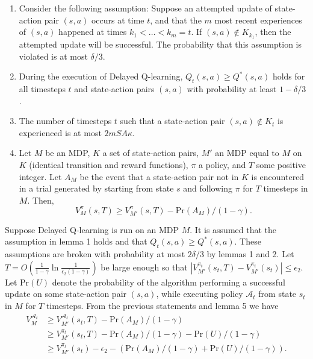 \documentclass[10pt]{article}
\begin{document}
\begin{enumerate}

\item Consider the following assumption:  Suppose an attempted update of state-action pair $(s,a)$ occurs at time $t$, and that the $m$ most recent experiences of $(s,a)$ happened at times $k_1 < \dots < k_m = t$.  If $(s,a) \notin K_{k_1}$, then the attempted update will be successful.  The probability that this assumption is violated is at most $\delta/3$.  


\item During the execution of Delayed Q-learning, $Q_t(s,a) \geq Q^*(s,a)$ holds for all timesteps $t$ and state-action pairs $(s,a)$ with probability at least $1-\delta/3$.

\item The number of timesteps $t$ such that a state-action pair $(s,a) \notin K_t$ is experienced is at most $2mSA\kappa$.

\item Let $M$ be an MDP, $K$ a set of state-action pairs, $M'$ an MDP equal to $M$ on $K$ (identical transition and reward functions), $\pi$ a policy, and
$T$ some positive integer. Let $A_M$ be the event that a state-action pair not in $K$ is encountered in a trial generated by starting from state $s$ and following $\pi$ for $T$ timesteps in $M$. Then,
$$V_M^\pi(s,T)\geq V_{M'}^{\pi}(s,T)-\text{Pr}(A_M)/(1-\gamma).$$

\end{enumerate}

Suppose Delayed Q-learning is run on an MDP $M$. It is assumed that the assumption in lemma 1 holds and that $Q_t(s,a) \geq Q^*(s,a)$.  These assumptions are broken with probability at most $2\delta/3$ by lemmas 1 and 2.  
Let $T=O\left(\frac{1}{1-\gamma}\ln{\frac{1}{\epsilon_2(1-\gamma)}}\right)$ be large enough so that $|V_{M'}^{\pi_t}(s_t,T) - V_{M'}^{\pi_t}(s_t)| \leq \epsilon_2$.   Let $\text{Pr}(U)$ denote the probability of
the algorithm performing a successful update on some
state-action pair $(s, a)$, while executing policy
$\mathcal{A}_t$ from state $s_t$ in $M$ for $T$ timesteps. From the previous statements and lemma 5 we have 
\begin{align*}
V_M^{\mathcal{A}_t} & \geq V_{M'}^{\mathcal{A}_t}(s_t,T)-\text{Pr}(A_M)/(1-\gamma) \\
 & \geq V_{M'}^{\pi_t}(s_t,T)-\text{Pr}(A_M)/(1-\gamma) -\text{Pr}(U)/(1-\gamma) \\
 & \geq V_{M'}^{\pi_t}(s_t)-\epsilon_2-(\text{Pr}(A_M)/(1-\gamma) +\text{Pr}(U)/(1-\gamma)). 
\end{align*}
\end{document}
